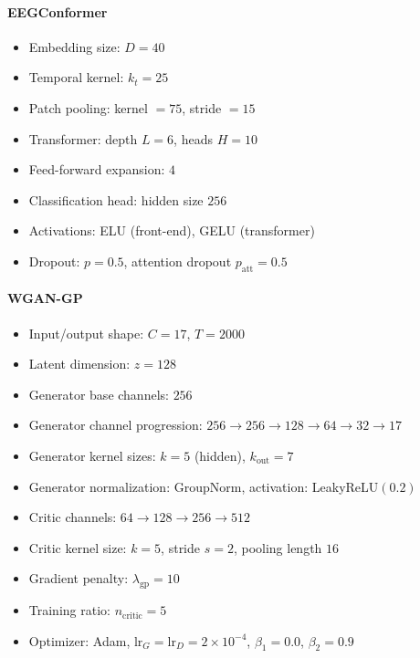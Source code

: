 \paragraph{EEGConformer}
\begin{itemize}
    \item Embedding size: $D=40$
    \item Temporal kernel: $k_t=25$
    \item Patch pooling: kernel $=75$, stride $=15$
    \item Transformer: depth $L=6$, heads $H=10$
    \item Feed-forward expansion: $4$
    \item Classification head: hidden size $256$
    \item Activations: ELU (front-end), GELU (transformer)
    \item Dropout: $p=0.5$, attention dropout $p_{\text{att}}=0.5$
\end{itemize}

\paragraph{WGAN-GP}
\begin{itemize}
    \item Input/output shape: $C=17$, $T=2000$
    \item Latent dimension: $z=128$
    \item Generator base channels: $256$
    \item Generator channel progression: $256 \rightarrow 256 \rightarrow 128 \rightarrow 64 \rightarrow 32 \rightarrow 17$
    \item Generator kernel sizes: $k=5$ (hidden), $k_{\text{out}}=7$
    \item Generator normalization: GroupNorm, activation: LeakyReLU$(0.2)$
    \item Critic channels: $64 \rightarrow 128 \rightarrow 256 \rightarrow 512$
    \item Critic kernel size: $k=5$, stride $s=2$, pooling length $16$
    \item Gradient penalty: $\lambda_{\mathrm{gp}}=10$
    \item Training ratio: $n_{\text{critic}}=5$
    \item Optimizer: Adam, $\mathrm{lr}_G=\mathrm{lr}_D=2 \times 10^{-4}$, $\beta_1=0.0$, $\beta_2=0.9$
\end{itemize}

